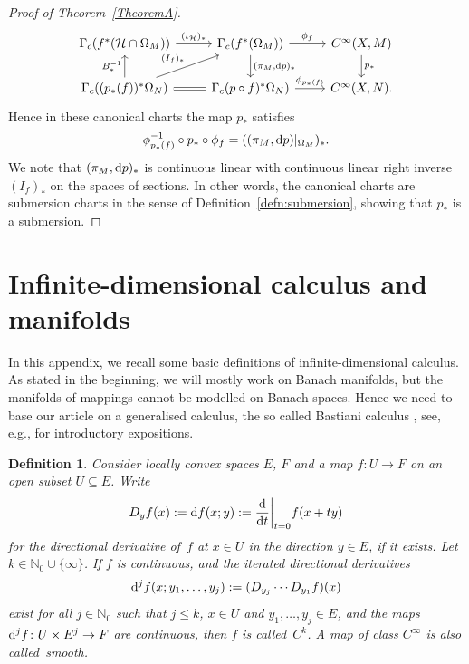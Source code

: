 \documentclass[11pt]{article}
\numberwithin{equation}{section}
\numberwithin{equation}{section}
\newtheorem{Definition}[Theorem]{Definition}
\newcommand{\cH}{\ensuremath{\mathcal{H}}}
\newcommand{\N}{\ensuremath{\mathbb{N}}}
\begin{document}
\begin{proof}[Proof of Theorem~\ref{TheoremA}]
\begin{displaymath}
\begin{tikzcd}
\Gamma_c (f^\ast (\cH \cap \Omega_M)) \arrow[r,"(\iota_{\cH})_\ast"] & \Gamma_c (f^\ast (\Omega_M)) \arrow[r, "\phi_f"] \arrow[d,"{(\pi_M ,{\rm d}p)_\ast}"] & C^\infty (X,M) \arrow[d, "p_\ast"] \\
\Gamma_c ((p_\ast(f))^\ast \Omega_N) \arrow[u,"B^{-1}_\ast"] \arrow[r,equal] \arrow[ru,"(I_f)_\ast"]& \Gamma_c (p \circ f)^\ast \Omega_N) \arrow[r,"\phi_{p_\ast (f)}"] &
C^\infty (X,N).
\end{tikzcd}
\end{displaymath}
Hence in these canonical charts the map $p_\ast$ satisfies
\begin{displaymath}
\phi^{-1}_{p_\ast(f)} \circ p_\ast \circ \phi_f = ((\pi_M,{\rm d}p)|_{\Omega_M})_\ast.
\end{displaymath}
We note that $(\pi_M,{\rm d}p)_\ast$ is continuous linear with continuous linear right inverse $(I_f)_\ast$ on the spaces of sections. In other words, the canonical charts are submersion charts in the sense of Definition~\ref{defn:submersion}, showing that $p_\ast$ is a submersion.
\end{proof}

\appendix\setcounter{section}{0}
\section{Infinite-dimensional calculus and manifolds}\label{App:Bast}

In this appendix, we recall some basic definitions of infinite-dimensional calculus.
As stated in the beginning, we will mostly work on Banach manifolds, but the manifolds of mappings cannot be modelled on Banach spaces. Hence we need to base our article on a generalised calculus, the so called Bastiani calculus \cite{Bas64}, see, e.g., \cite{GaS22, Sch23} for introductory expositions.

\begin{Definition}%
Consider locally convex spaces $E$, $F$
and a map $f\colon U\rightarrow F$ on an open subset $U\subseteq E$.
Write
\[
D_yf(x):= {\rm d}f(x;y):= \frac{{\rm d}}{{\rm d}t}\biggr|_{t=0}f(x+ty)
\]
for the directional derivative of~$f$ at $x\in U$
in the direction $y\in E$, if it exists.
Let $k\in \N_0\cup\{\infty\}$.
If $f$ is continuous, and the iterated directional derivatives
\[
{\rm d}^jf(x;y_1,\dots, y_j):= (D_{y_j}\cdots D_{y_1}f)(x)
\]
exist for all $j\in\N_0$ such that
$j\leq k$, $x\in U$ and $y_1,\dots, y_j\in E$,
and the maps ${\rm d}^jf\colon U\times E^j\to F$
are continuous, then $f$ is called~$C^k$.
A map of class $C^\infty$ is also called~\emph{smooth}.
\end{Definition}
\end{document}
